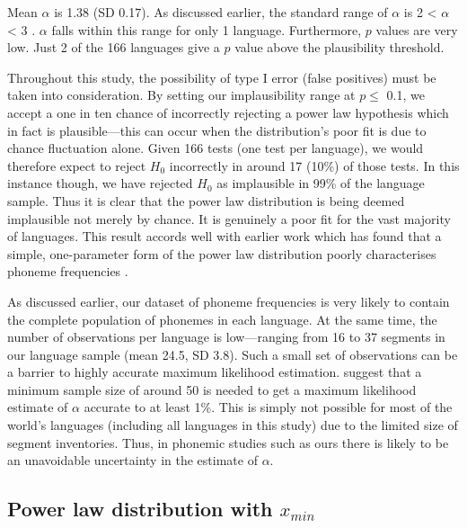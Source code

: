Mean \(\alpha\) is 1.38 (SD 0.17). As discussed earlier, the standard range of \(\alpha\) is 2 \textless{} \(\alpha\) \textless{} 3 \autocite[p.~662]{clauset_power-law_2009}. \(\alpha\) falls within this range for only 1 language. Furthermore, \(p\) values are very low. Just 2 of the 166 languages give a \(p\) value above the plausibility threshold.

Throughout this study, the possibility of type I error (false positives) must be taken into consideration. By setting our implausibility range at \(p \leq\) 0.1, we accept a one in ten chance of incorrectly rejecting a power law hypothesis which in fact is plausible---this can occur when the distribution's poor fit is due to chance fluctuation alone. Given 166 tests (one test per language), we would therefore expect to reject \(H_0\) incorrectly in around 17 (10\%) of those tests. In this instance though, we have rejected \(H_0\) as implausible in 99\% of the language sample. Thus it is clear that the power law distribution is being deemed implausible not merely by chance. It is genuinely a poor fit for the vast majority of languages. This result accords well with earlier work which has found that a simple, one-parameter form of the power law distribution poorly characterises phoneme frequencies \autocites{sigurd_rank-frequency_1968}{martindale_comparison_1996}{tambovtsev_phoneme_2007}.

As discussed earlier, our dataset of phoneme frequencies is very likely to contain the complete population of phonemes in each language. At the same time, the number of observations per language is low---ranging from 16 to 37 segments in our language sample (mean 24.5, SD 3.8). Such a small set of observations can be a barrier to highly accurate maximum likelihood estimation. \textcite[p.~669]{clauset_power-law_2009} suggest that a minimum sample size of around 50 is needed to get a maximum likelihood estimate of \(\alpha\) accurate to at least 1\%. This is simply not possible for most of the world's languages (including all languages in this study) due to the limited size of segment inventories. Thus, in phonemic studies such as ours there is likely to be an unavoidable uncertainty in the estimate of \(\alpha\).

\hypertarget{power-law-xmin-results}{%
\subsection{\texorpdfstring{Power law distribution with \(x_{min}\)}{Power law distribution with x\_\{min\}}}\label{power-law-xmin-results}}


